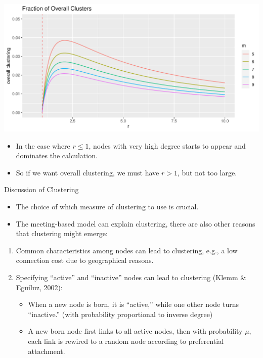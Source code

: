 \documentclass{beamer}
\begin{document}
\begin{frame}{}
	\begin{center}
		\includegraphics[width=\textwidth]{figures-R/overall-clustering-estimation.pdf}
	\end{center}
	\begin{itemize}
		\item
			In the case where $r\leq1$,
			nodes with very high degree starts to appear and dominates the calculation.
		\item
			So if we want overall clustering,
			we must have $r>1$,
			but not too large.
			\hfill\hyperlink{fig:clustering-estimation}{}
	\end{itemize}
\end{frame}

\begin{frame}{Discussion of Clustering}
	\begin{itemize}
		\item
			The choice of which measure of clustering to use is crucial.
		\item
			The meeting-based model can explain clustering,
			there are also other reasons that clustering might emerge:
	\end{itemize}
	\begin{enumerate}
		\item
			Common characteristics among nodes can lead to clustering, e.g.,
			a low connection cost due to geographical reasons.
		\item
			Specifying ``active'' and ``inactive'' nodes can lead to clustering (Klemm \& Egu\'iluz, 2002):
			\begin{itemize}
				\item
					When a new node is born, it is ``active,''
					while one other node turns ``inactive.'' (with probability proportional to inverse degree)
				\item
					A new born node first links to all active nodes,
					then with probability $\mu$,
					each link is rewired to a random node according to preferential attachment.
			\end{itemize}
	\end{enumerate}
\end{frame}
\end{document}
